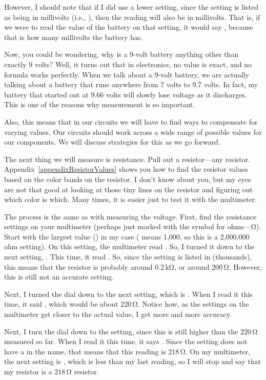 However, I should note that if I did use a lower setting, since the setting is listed as being in millivolts (i.e., ), then the reading will also be in millivolts.  
That is, if we were to read the value of the battery on that setting, it would say , because that is how many millivolts the battery has.

Now, you could be wondering, why is a 9-volt battery anything other than exactly 9 volts?
Well, it turns out that in electronics, no value is exact, and no formula works perfectly.
When we talk about a 9-volt battery, we are actually talking about a battery that runs anywhere from 7 volts to 9.7 volts.
In fact, my battery that started out at 9.66 volts will slowly lose voltage as it discharges.
This is one of the reasons why measurement is so important.

Also, this means that in our circuits we will have to find ways to compensate for varying values.
Our circuits should work across a wide range of possible values for our components.
We will discuss strategies for this as we go forward.

The next thing we will measure is resistance.
Pull out a resistor---any resistor.
Appendix~\ref{appendixResistorValues} shows you how to find the resistor values based on the color bands on the resistor.
I don't know about you, but my eyes are not that good at looking at those tiny lines on the resistor and figuring out which color is which.
Many times, it is easier just to test it with the multimeter.

The process is the same as with measuring the voltage.
First, find the resistance settings on your multimeter (perhaps just marked with the symbol for ohms---\si{\ohm}).
Start with the largest value () in my case ( means 1,000, so this is a 2,000,000 ohm setting).
On this setting, the multimeter read .
So, I turned it down to the next setting, .  
This time, it read .
So, since the setting is listed in  (thousands), this means that the resistor is probably around $0.2\,\si{\kilo\ohm}$, or around $200\,\si{\ohm}$.
However, this is still not an accurate setting.

Next, I turned the dial down to the next setting, which is .
When I read it this time, it said , which would be about $220\,\si{\ohm}$.
Notice how, as the settings on the multimeter get closer to the actual value, I get more and more accuracy.

Next, I turn the dial down to the  setting, since this is still higher than the $220\,\si{\ohm}$ measured so far.
When I read it this time, it says .  
Since the setting does not have a  in the name, that means that this reading is $218\,\si{\ohm}$.
On my multimeter, the next setting is , which is less than my last reading, so I will stop and say that my resistor is a $218\,\si{\ohm}$ resistor.

